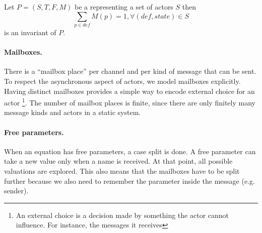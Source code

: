 \documentclass[a4paper]{report}
\numberwithin{algorithm}{chapter}
\begin{document}
\noindent
Let $P = (S,T,F,M)$ be a \pn{} representing a set of actors $S$ then
\begin{equation*}
\sum_{p \in \mathit{def}} M(p) = 1, \forall (\mathit{def}, \mathit{state}) \in S
\end{equation*}
is an invariant of $P$.

\paragraph{Mailboxes.}
There is a ``mailbox place'' per channel and per kind of message that can be sent.
To respect the asynchronous aspect of actors, we model mailboxes explicitly.
Having distinct mailboxes provides a simple way to encode external choice for an actor
\footnote{An external choice is a decision made by something the actor cannot influence. For instance, the messages it receives}.
The number of mailbox places is finite, since there are only finitely many message kinds and actors in a static system.

\paragraph{Free parameters.}
When an equation has free parameters, a case split is done.
A free parameter can take a new value only when a name is received.
At that point, all possible valuations are explored.
This also means that the mailboxes have to be split further because we also need to remember the parameter inside the message (e.g. sender).
\end{document}
